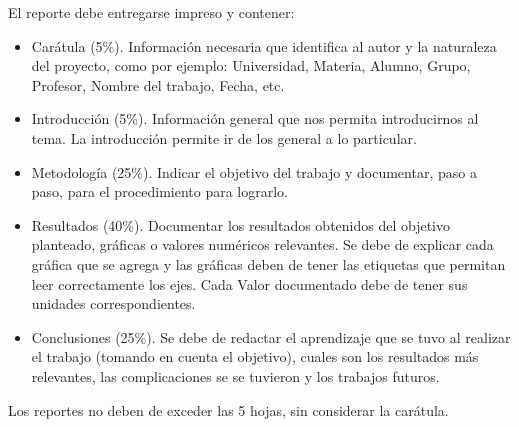 \documentclass[spanish, letterpaper,12]{article}
\begin{document}
El reporte debe entregarse impreso y contener:
\begin{itemize}
\item Carátula (5\%). Información necesaria que identifica al autor y la naturaleza del proyecto, como por ejemplo: Universidad, Materia, Alumno, Grupo, Profesor, Nombre del trabajo, Fecha, etc.
\item Introducción (5\%). Información general que nos permita introducirnos al tema. La introducción permite ir de los general a lo particular.
\item Metodología (25\%). Indicar el objetivo del trabajo y documentar, paso a paso, para el procedimiento para lograrlo.   
\item Resultados (40\%). Documentar los resultados obtenidos del objetivo planteado, gráficas o valores numéricos relevantes. Se debe de explicar cada gráfica que se agrega y las gráficas deben de tener las etiquetas que permitan leer correctamente los ejes. Cada Valor documentado debe de tener sus unidades correspondientes.
\item Conclusiones (25\%). Se debe de redactar el aprendizaje que se tuvo al realizar el trabajo (tomando en cuenta el objetivo), cuales son los resultados más relevantes, las complicaciones se se tuvieron y los trabajos futuros.
\end{itemize}

Los reportes no deben de exceder las 5 hojas, sin considerar la carátula.
\end{document}
